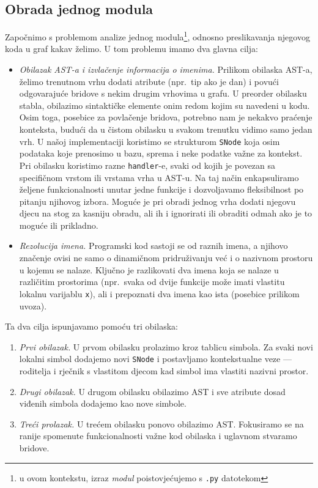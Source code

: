 \subsection{Obrada jednog modula}
Započnimo s problemom analize jednog modula\footnote{u ovom kontekstu,
izraz \emph{modul} poistovjećujemo s \texttt{.py} datotekom},
 odnosno preslikavanja njegovog koda u graf kakav želimo. U tom problemu imamo
dva glavna cilja:
\begin{itemize}
\item \textit{Obilazak AST-a i izvlačenje informacija o imenima.} Prilikom obilaska AST-a, želimo trenutnom vrhu
dodati atribute (npr.\ tip ako je dan) i povući odgovarajuće bridove s nekim drugim vrhovima u grafu. U
preorder obilasku stabla, obilazimo sintaktičke elemente onim redom kojim su navedeni u kodu. Osim toga,
posebice za povlačenje bridova, potrebno nam je nekakvo praćenje konteksta, budući da u čistom
obilasku u svakom trenutku vidimo samo jedan vrh. U našoj implementaciji koristimo se strukturom
\texttt{SNode} koja osim podataka koje prenosimo u bazu, sprema i neke podatke važne za kontekst.
Pri obilasku koristimo razne \texttt{handler}-e, svaki od kojih je povezan sa specifičnom
vrstom ili vrstama vrha u AST-u. Na taj način enkapsuliramo željene funkcionalnosti unutar
jedne funkcije i dozvoljavamo fleksibilnost po pitanju njihovog izbora. Moguće je pri
obradi jednog vrha dodati njegovu djecu na stog za kasniju obradu, ali ih i ignorirati ili
obraditi odmah ako je to moguće ili prikladno.

\item \textit{Rezolucija imena.} Programski kod sastoji se od raznih imena, a njihovo značenje ovisi ne samo
o dinamičnom pridruživanju već i o nazivnom prostoru u kojemu se nalaze. Ključno je razlikovati dva
imena koja se nalaze u različitim prostorima (npr.\ svaka od dvije funkcije može imati vlastitu lokalnu
varijablu \texttt{x}), ali i prepoznati dva imena kao ista (posebice prilikom uvoza).
\end{itemize}

Ta dva cilja ispunjavamo pomoću tri obilaska:
\begin{enumerate}
\item \textit{Prvi obilazak.} U prvom obilasku prolazimo kroz tablicu simbola.
	Za svaki novi lokalni simbol dodajemo novi \texttt{SNode} i postavljamo
	kontekstualne veze --- roditelja i rječnik s vlastitom djecom kad simbol
	ima vlastiti nazivni prostor.
\item \textit{Drugi obilazak.} U drugom obilasku obilazimo AST i sve atribute dosad viđenih
	simbola dodajemo kao nove simbole.
\item \textit{Treći prolazak.} U trećem obilasku ponovo obilazimo AST. Fokusiramo se na ranije spomenute
	funkcionalnosti važne kod obilaska i uglavnom stvaramo bridove.
\end{enumerate}


